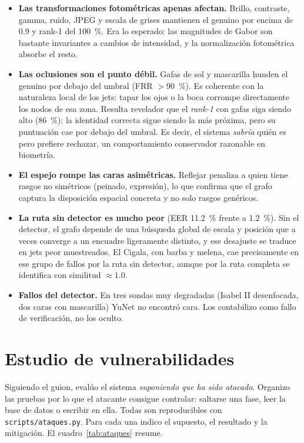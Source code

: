 \documentclass[11pt,a4paper]{article}
\begin{document}
\begin{itemize}[nosep]
  \item \textbf{Las transformaciones fotométricas apenas afectan.} Brillo, contraste, gamma,
  ruido, JPEG y escala de grises mantienen el genuino por encima de 0.9 y rank-1 del
  \SI{100}{\percent}. Era lo esperado: las magnitudes de Gabor son bastante invariantes a
  cambios de intensidad, y la normalización fotométrica absorbe el resto.
  \item \textbf{Las oclusiones son el punto débil.} Gafas de sol y mascarilla hunden el genuino
  por debajo del umbral (FRR $>$\SI{90}{\percent}). Es coherente con la naturaleza local de los
  jets: tapar los ojos o la boca corrompe directamente los nodos de esa zona. Resulta
  revelador que el \emph{rank-1} con gafas siga siendo alto (\SI{86}{\percent}): la identidad
  correcta sigue siendo la más próxima, pero su puntuación cae por debajo del umbral. Es decir,
  el sistema \emph{sabría} quién es pero prefiere rechazar, un comportamiento conservador
  razonable en biometría.
  \item \textbf{El espejo rompe las caras asimétricas.} Reflejar penaliza a quien tiene rasgos
  no simétricos (peinado, expresión), lo que confirma que el grafo captura la disposición
  espacial concreta y no solo rasgos genéricos.
  \item \textbf{La ruta sin detector es mucho peor} (EER \SI{11.2}{\percent} frente a
  \SI{1.2}{\percent}). Sin el detector, el grafo depende de una búsqueda global de escala y
  posición que a veces converge a un encuadre ligeramente distinto, y ese desajuste se traduce
  en jets peor muestreados. El Cigala, con barba y melena, cae precisamente en ese grupo de
  fallos por la ruta sin detector, aunque por la ruta completa se identifica con similitud
  $\approx 1.0$.
  \item \textbf{Fallos del detector.} En tres sondas muy degradadas (Isabel II desenfocada,
  dos caras con mascarilla) YuNet no encontró cara. Los contabilizo como fallo de verificación,
  no los oculto.
\end{itemize}

\section{Estudio de vulnerabilidades}
\label{sec:vuln}

Siguiendo el guion, evalúo el sistema \emph{suponiendo que ha sido atacado}. Organizo las
pruebas por lo que el atacante consigue controlar: saltarse una fase, leer la base de datos o
escribir en ella. Todas son reproducibles con \texttt{scripts/ataques.py}. Para cada una
indico el supuesto, el resultado y la mitigación. El cuadro~\ref{tab:ataques} resume.
\end{document}
